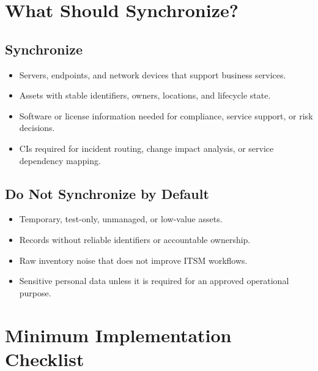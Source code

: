 \documentclass[11pt]{article}
\begin{document}
\section{What Should Synchronize?}

\subsection{Synchronize}
\begin{itemize}
  \item Servers, endpoints, and network devices that support business services.
  \item Assets with stable identifiers, owners, locations, and lifecycle state.
  \item Software or license information needed for compliance, service support, or risk decisions.
  \item CIs required for incident routing, change impact analysis, or service dependency mapping.
\end{itemize}

\subsection{Do Not Synchronize by Default}
\begin{itemize}
  \item Temporary, test-only, unmanaged, or low-value assets.
  \item Records without reliable identifiers or accountable ownership.
  \item Raw inventory noise that does not improve ITSM workflows.
  \item Sensitive personal data unless it is required for an approved operational purpose.
\end{itemize}

\section{Minimum Implementation Checklist}
\end{document}
